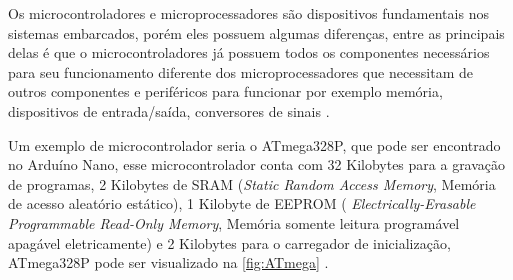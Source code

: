     \par
    Os microcontroladores e microprocessadores são dispositivos fundamentais nos sistemas embarcados, porém eles possuem algumas diferenças,
    entre as principais delas é que o microcontroladores já possuem todos os componentes necessários para seu funcionamento diferente dos microprocessadores que necessitam de outros componentes e periféricos para funcionar por exemplo memória, dispositivos de entrada/saída, conversores de sinais \cite{ayala:1991}.  
    
    \par
    Um exemplo de microcontrolador seria o ATmega328P, que pode ser encontrado no Arduíno Nano, esse microcontrolador conta com 32 Kilobytes para a gravação de programas, 2 Kilobytes de SRAM (\textit{Static Random Access Memory}, Memória de acesso aleatório estático), 1 Kilobyte de EEPROM ( \textit{Electrically-Erasable Programmable Read-Only Memory}, Memória somente leitura programável apagável eletricamente) e 2 Kilobytes para o carregador de inicialização, ATmega328P pode ser visualizado na \autoref{fig:ATmega} \cite{arduino}.

